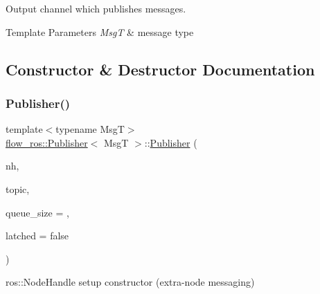 Output channel which publishes messages. 


\begin{DoxyTemplParams}{Template Parameters}
{\em MsgT} & message type \\
\hline
\end{DoxyTemplParams}


\subsection{Constructor \& Destructor Documentation}
\mbox{\label{classflow__ros_1_1_publisher_a51a76fa72d57c38e23857c0c95103ef4}} 
\subsubsection{\texorpdfstring{Publisher()}{Publisher()}\hspace{0.1cm}{\footnotesize\ttfamily [1/2]}}
{\footnotesize\ttfamily template$<$typename MsgT$>$ \\
\hyperlink{classflow__ros_1_1_publisher}{flow\+\_\+ros\+::\+Publisher}$<$ MsgT $>$\+::\hyperlink{classflow__ros_1_1_publisher}{Publisher} (\begin{DoxyParamCaption}\item[{ros\+::\+Node\+Handle \&}]{nh,  }\item[{const std\+::string \&}]{topic,  }\item[{std\+::uint32\+\_\+t}]{queue\+\_\+size = {},  }\item[{const bool}]{latched = {\ttfamily false} }\end{DoxyParamCaption})\hspace{0.3cm}{\ttfamily [inline]}}



{\ttfamily ros\+::\+Node\+Handle} setup constructor (extra-\/node messaging) 


